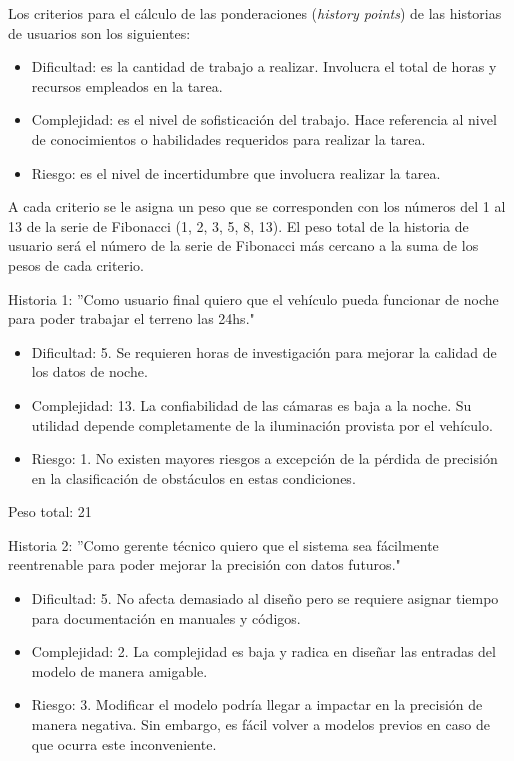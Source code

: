 \documentclass[
11pt, %
]{charter}
\begin{document}
Los criterios para el cálculo de las ponderaciones (\textit{history points}) de las historias de usuarios son los siguientes:

\begin{itemize}
	\item Dificultad: es la cantidad de trabajo a realizar. Involucra el total de horas y recursos empleados en la tarea.
	\item Complejidad: es el nivel de sofisticación del trabajo. Hace referencia al nivel de conocimientos o habilidades requeridos para realizar la tarea.
	\item Riesgo: es el nivel de incertidumbre que involucra realizar la tarea.
\end{itemize}

A cada criterio se le asigna un peso que se corresponden con los números del 1 al 13 de la serie de Fibonacci (1, 2, 3, 5, 8, 13). El peso total de la historia de usuario será el número de la serie de Fibonacci más cercano a la suma de los pesos de cada criterio.

Historia 1: ''Como usuario final quiero que el vehículo pueda funcionar de noche para poder trabajar el terreno las 24hs."

\begin{itemize}
	\item Dificultad: 5. Se requieren horas de investigación para mejorar la calidad de los datos de noche.
	\item Complejidad: 13. La confiabilidad de las cámaras es baja a la noche. Su utilidad depende completamente de la iluminación provista por el vehículo.
	\item Riesgo: 1. No existen mayores riesgos a excepción de la pérdida de precisión en la clasificación de obstáculos en estas condiciones.
\end{itemize}

Peso total: 21

Historia 2: ''Como gerente técnico quiero que el sistema sea fácilmente reentrenable para poder mejorar la precisión con datos futuros."

\begin{itemize}
	\item Dificultad: 5. No afecta demasiado al diseño pero se requiere asignar tiempo para documentación en manuales y códigos.
	\item Complejidad: 2. La complejidad es baja y radica en diseñar las entradas del modelo de manera amigable.
	\item Riesgo: 3. Modificar el modelo podría llegar a impactar en la precisión de manera negativa. Sin embargo, es fácil volver a modelos previos en caso de que ocurra este inconveniente.
\end{itemize}
	
\end{document}
